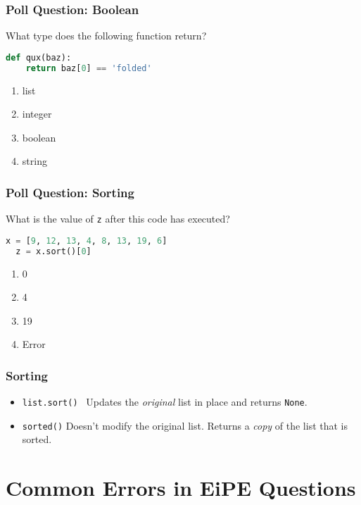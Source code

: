\documentclass{beamer}
\begin{document}
%
%
\begin{frame}[fragile]
  \frametitle{Poll Question: Boolean} 
  What type does the following function return?
  \vfill
  \begin{lstlisting}[language=Python, autogobble]
  def qux(baz):
    return baz[0] == 'folded'
  \end{lstlisting}
  \vfill
  \begin{enumerate}[A]
    \item list
    \item integer
    \item boolean
    \item string
  \end{enumerate}
\end{frame}

%
%
\begin{frame}[fragile]
  \frametitle{Poll Question: Sorting} 
  What is the value of \lstinline|z| after this code has executed?
  \vfill
  \begin{lstlisting}[language=Python, autogobble]
  x = [9, 12, 13, 4, 8, 13, 19, 6]
  z = x.sort()[0]
  \end{lstlisting}
  \vfill
  \begin{enumerate}[A]
    \item 0
    \item 4
    \item 19
    \item Error 
  \end{enumerate}
\end{frame}

%
%
\begin{frame}[fragile]
  \frametitle{Sorting} 
  \begin{itemize}
    \item \lstinline|list.sort()| \textrightarrow\ Updates the \textit{original} list in place and returns \lstinline|None|.
    \item \lstinline|sorted()| Doesn't modify the original list. Returns a \textit{copy} of the list that is sorted.
  \end{itemize}
\end{frame}

\section{Common Errors in EiPE Questions}
\end{document}
